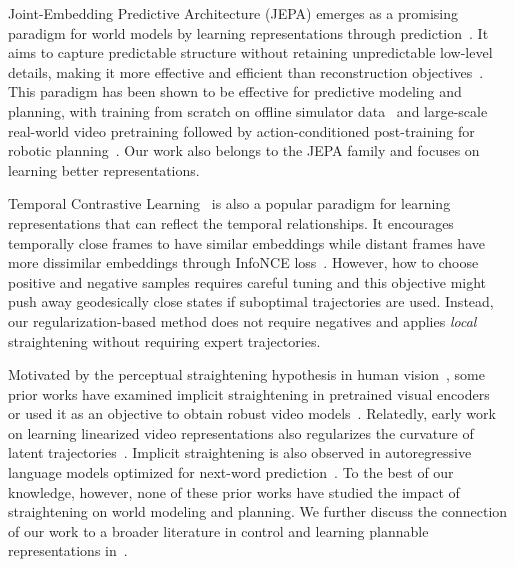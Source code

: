 Joint-Embedding Predictive Architecture (JEPA) emerges as a promising paradigm for world models by learning representations through prediction~\citep{jepa, vjepa, assran2025vjepa2selfsupervisedvideo}. It aims to capture predictable structure without retaining unpredictable low-level details, making it more effective and efficient than reconstruction objectives~\citep{vanassel2025jointembeddingvsreconstruction}. This paradigm has been shown to be effective for predictive modeling and planning, with training from scratch on offline simulator data~\citep{sobal2025learning} and large-scale real-world video pretraining followed by action-conditioned post-training for robotic planning~\citep{assran2025vjepa2selfsupervisedvideo}. Our work also belongs to the JEPA family and focuses on learning better representations.

Temporal Contrastive Learning~\citep{sermanet2018timecontrastivenetworksselfsupervisedlearning, tclr, eysenbach2024inference, yang2025memory} is also a popular paradigm for learning representations that can reflect the temporal relationships. It encourages temporally close frames to have similar embeddings while distant frames have more dissimilar embeddings through InfoNCE loss~\citep{radford2021learningtransferablevisualmodels}. However, how to choose positive and negative samples requires careful tuning and this objective might push away geodesically close states if suboptimal trajectories are used. Instead, our regularization-based method does not require negatives and applies \emph{local} straightening without requiring expert trajectories. 

Motivated by the perceptual straightening hypothesis in human vision~\citep{perceptual_straightening}, some prior works have examined implicit straightening in pretrained visual encoders~\citep{harrington2023exploring,interno2025aigenerated} or used it as an objective to obtain robust video models~\citep{niu2024learning, bagad2025chirality}. Relatedly, early work on learning linearized video representations also regularizes the curvature of latent trajectories~\citep{goroshin2015learninglinearizeuncertainty}. Implicit straightening is also observed in autoregressive language models optimized for next-word prediction~\citep{hosseini2023large, hosseini2026context}. To the best of our knowledge, however, none of these prior works have studied the impact of straightening on world modeling and planning. We further discuss the connection of our work to a broader literature in control and learning plannable representations in~.


